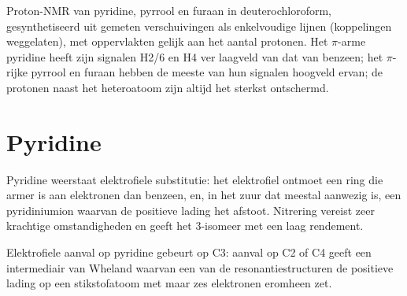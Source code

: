 \begin{omfigure}

{\small Proton-NMR van pyridine, pyrrool en furaan in deuterochloroform,
gesynthetiseerd uit gemeten verschuivingen als enkelvoudige lijnen
(koppelingen weggelaten), met oppervlakten gelijk aan het aantal
protonen. Het $\pi$-arme pyridine heeft zijn signalen H2/6 en H4
ver laagveld van dat van benzeen; het $\pi$-rijke pyrrool en furaan hebben
de meeste van hun signalen hoogveld ervan; de protonen naast het
heteroatoom zijn altijd het sterkst ontschermd.}
\end{omfigure}

\section{Pyridine}

Pyridine weerstaat elektrofiele substitutie: het elektrofiel ontmoet een
ring die armer is aan elektronen dan benzeen, en, in het zuur dat
meestal aanwezig is, een pyridiniumion waarvan de positieve lading het
afstoot. Nitrering vereist zeer krachtige omstandigheden en geeft het
3-isomeer met een laag rendement.

\begin{proposition}\label{prop:b3:heterocycles:pyridine-c3}
Elektrofiele aanval op pyridine gebeurt op C3: aanval op C2 of C4 geeft
een intermediair van Wheland waarvan een van de resonantiestructuren de
positieve lading op een stikstofatoom met maar zes elektronen eromheen
zet.
\end{proposition}

